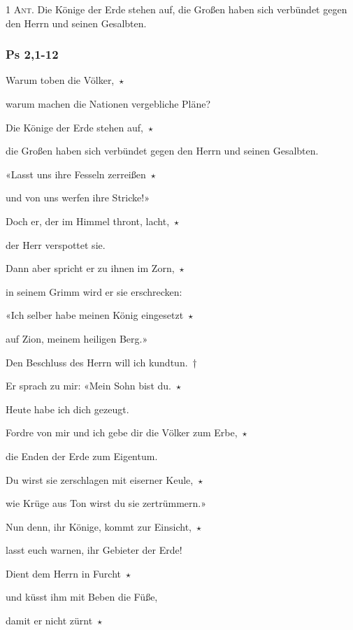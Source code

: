 \noindent \textsc{1 Ant.} Die Könige der Erde stehen auf, die Großen haben sich verbündet gegen den Herrn und seinen Gesalbten.

\subsubsection{Ps 2,1-12}

Warum toben die Völker,~$\star$~\nopagebreak

warum machen die Nationen vergebliche Pläne?
 
\noindent Die Könige der Erde stehen auf,~$\star$~\nopagebreak

die Großen haben sich verbündet gegen den Herrn und seinen Gesalbten.
 
\noindent «Lasst uns ihre Fesseln zerreißen~$\star$~\nopagebreak

und von uns werfen ihre Stricke!»
 
\noindent Doch er, der im Himmel thront, lacht,~$\star$~\nopagebreak

der Herr verspottet sie.
 
\noindent Dann aber spricht er zu ihnen im Zorn,~$\star$~\nopagebreak

in seinem Grimm wird er sie erschrecken:
 
\noindent «Ich selber habe meinen König eingesetzt~$\star$~\nopagebreak

auf Zion, meinem heiligen Berg.»
 
\noindent Den Beschluss des Herrn will ich kundtun.~†~\nopagebreak

Er sprach zu mir: «Mein Sohn bist du.~$\star$~\nopagebreak

Heute habe ich dich gezeugt.
 
\noindent Fordre von mir und ich gebe dir die Völker zum Erbe,~$\star$~\nopagebreak

die Enden der Erde zum Eigentum.
 
\noindent Du wirst sie zerschlagen mit eiserner Keule,~$\star$~\nopagebreak

wie Krüge aus Ton wirst du sie zertrümmern.»
 
\noindent Nun denn, ihr Könige, kommt zur Einsicht,~$\star$~\nopagebreak

lasst euch warnen, ihr Gebieter der Erde!
 
\noindent Dient dem Herrn in Furcht~$\star$~\nopagebreak

und küsst ihm mit Beben die Füße,
 
\noindent damit er nicht zürnt~$\star$~\nopagebreak

